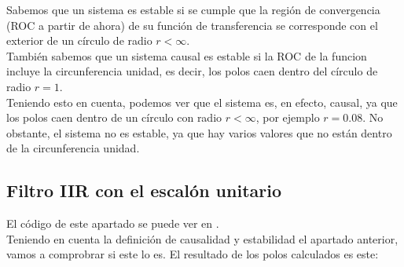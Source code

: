 \documentclass[11pt,a4paper]{article}
\begin{document}
	Sabemos que un sistema es estable si se cumple que la región de convergencia (ROC a partir de ahora) de su función de transferencia se corresponde con el exterior de un círculo de radio $r<\infty$.\\
	
	También sabemos que un sistema causal es estable si la ROC de la funcion incluye la circunferencia unidad, es decir, los polos caen dentro del círculo de radio $r=1$.\\
	
	Teniendo esto en cuenta, podemos ver que el sistema es, en efecto, causal, ya que los polos caen dentro de un círculo con radio $r<\infty$, por ejemplo $r=0.08$.  No obstante, el sistema no es estable, ya que hay varios valores que no están dentro de la circunferencia unidad.
	
\subsection{Filtro IIR con el escalón unitario}

El código de este apartado se puede ver en \color{deepred}\color{black}.\\

Teniendo en cuenta la definición de causalidad y estabilidad el apartado anterior, vamos a comprobrar si este lo es. El resultado de los polos calculados es este:
\end{document}
